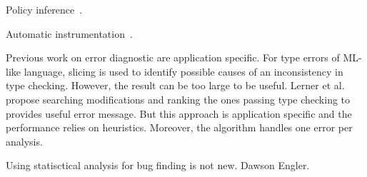 Policy inference~\cite{chong:sp11, harris:ccs10}.

Automatic instrumentation~\cite{king:esop10}.

Previous work on error diagnostic are application specific. For type errors of
ML-like language, slicing is used to identify possible causes of an
inconsistency in type checking. However, the result can be too large to be
useful. Lerner et al.~\cite{lerner:pldi07} propose searching modifications and
ranking the ones passing type checking to provides useful error message. But
this approach is application specific and the performance relies on heuristics. Moreover, the algorithm handles one error per analysis.

Using statisctical
analysis for bug finding is not new. Dawson Engler.





